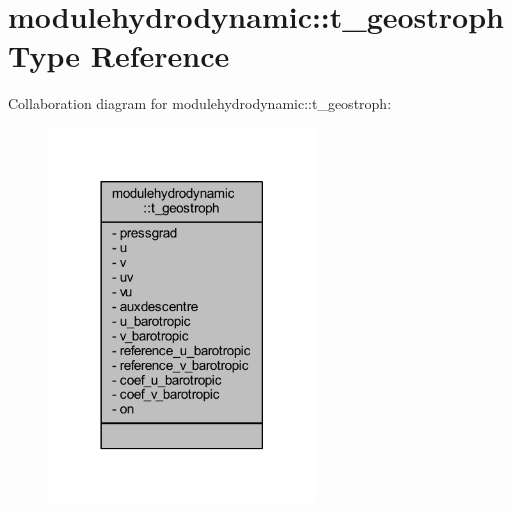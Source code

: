 \hypertarget{structmodulehydrodynamic_1_1t__geostroph}{}\section{modulehydrodynamic\+:\+:t\+\_\+geostroph Type Reference}
\label{structmodulehydrodynamic_1_1t__geostroph}


Collaboration diagram for modulehydrodynamic\+:\+:t\+\_\+geostroph\+:\nopagebreak
\begin{figure}[H]
\begin{center}
\leavevmode
\includegraphics[width=201pt]{structmodulehydrodynamic_1_1t__geostroph__coll__graph}
\end{center}
\end{figure}
